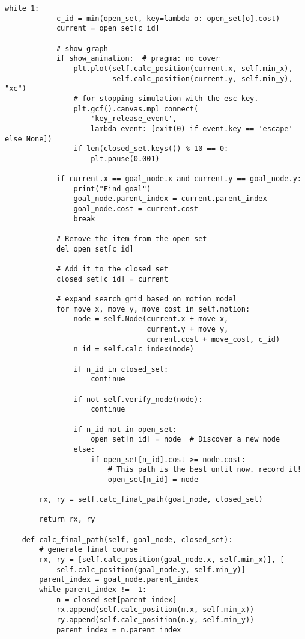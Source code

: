\begin{lstlisting}[caption=Grid based Dijkstra planning (Atsushi's project)(\autoref{Pathfinding}), label=Atsushi]
        while 1:
            c_id = min(open_set, key=lambda o: open_set[o].cost)
            current = open_set[c_id]

            # show graph
            if show_animation:  # pragma: no cover
                plt.plot(self.calc_position(current.x, self.min_x),
                         self.calc_position(current.y, self.min_y), "xc")
                # for stopping simulation with the esc key.
                plt.gcf().canvas.mpl_connect(
                    'key_release_event',
                    lambda event: [exit(0) if event.key == 'escape' else None])
                if len(closed_set.keys()) % 10 == 0:
                    plt.pause(0.001)

            if current.x == goal_node.x and current.y == goal_node.y:
                print("Find goal")
                goal_node.parent_index = current.parent_index
                goal_node.cost = current.cost
                break

            # Remove the item from the open set
            del open_set[c_id]

            # Add it to the closed set
            closed_set[c_id] = current

            # expand search grid based on motion model
            for move_x, move_y, move_cost in self.motion:
                node = self.Node(current.x + move_x,
                                 current.y + move_y,
                                 current.cost + move_cost, c_id)
                n_id = self.calc_index(node)

                if n_id in closed_set:
                    continue

                if not self.verify_node(node):
                    continue

                if n_id not in open_set:
                    open_set[n_id] = node  # Discover a new node
                else:
                    if open_set[n_id].cost >= node.cost:
                        # This path is the best until now. record it!
                        open_set[n_id] = node

        rx, ry = self.calc_final_path(goal_node, closed_set)

        return rx, ry

    def calc_final_path(self, goal_node, closed_set):
        # generate final course
        rx, ry = [self.calc_position(goal_node.x, self.min_x)], [
            self.calc_position(goal_node.y, self.min_y)]
        parent_index = goal_node.parent_index
        while parent_index != -1:
            n = closed_set[parent_index]
            rx.append(self.calc_position(n.x, self.min_x))
            ry.append(self.calc_position(n.y, self.min_y))
            parent_index = n.parent_index


\end{lstlisting}
